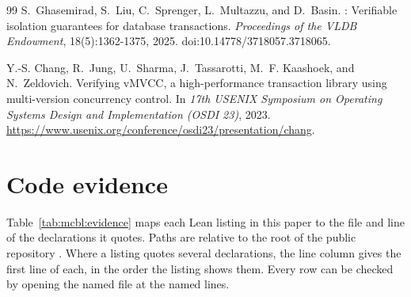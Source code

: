 \documentclass[11pt,letterpaper]{article}
\theoremstyle{definition}
\theoremstyle{remark}
\begin{document}
\begin{thebibliography}{99}
S.~Ghasemirad, S.~Liu, C.~Sprenger, L.~Multazzu, and D.~Basin.
: Verifiable isolation guarantees for database transactions.
\newblock \emph{Proceedings of the VLDB Endowment}, 18(5):1362-1375, 2025.
\newblock doi:10.14778/3718057.3718065.

Y.-S. Chang, R.~Jung, U.~Sharma, J.~Tassarotti, M.~F. Kaashoek, and N.~Zeldovich.
\newblock Verifying {vMVCC}, a high-performance transaction library using multi-version concurrency control.
\newblock In \emph{17th USENIX Symposium on Operating Systems Design and Implementation (OSDI 23)}, 2023.
\newblock \url{https://www.usenix.org/conference/osdi23/presentation/chang}.

\end{thebibliography}

\appendix

\section{Code evidence}
\label{app:mcbl:evidence}

Table~\ref{tab:mcbl:evidence} maps each Lean listing in this paper to the file and line of the declarations it quotes. Paths are relative to the root of the public repository \cite{yonedatx}. Where a listing quotes several declarations, the line column gives the first line of each, in the order the listing shows them. Every row can be checked by opening the named file at the named lines.
\end{document}
